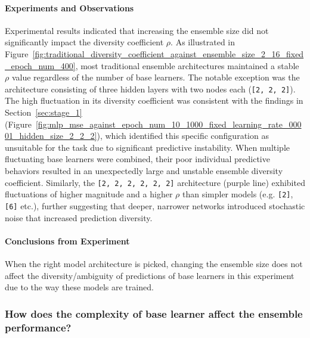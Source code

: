 \documentclass{article}
\begin{document}
\paragraph{Experiments and Observations}
Experimental results indicated that increasing the ensemble size did not significantly impact the diversity coefficient $\rho$. As illustrated in Figure~\ref{fig:traditional_diversity_coefficient_against_ensemble_size_2_16_fixed_epoch_num_400}, most traditional ensemble architectures maintained a stable $\rho$ value regardless of the number of base learners. The notable exception was the architecture consisting of three hidden layers with two nodes each (\texttt{[2, 2, 2]}). The high fluctuation in its diversity coefficient was consistent with the findings in Section~\ref{sec:stage_1} (Figure~\ref{fig:mlp_mse_against_epoch_num_10_1000_fixed_learning_rate_00001_hidden_size_2_2_2}), which identified this specific configuration as unsuitable for the task due to significant predictive instability. When multiple fluctuating base learners were combined, their poor individual predictive behaviors resulted in an unexpectedly large and unstable ensemble diversity coefficient. Similarly, the \texttt{[2, 2, 2, 2, 2, 2]} architecture (purple line) exhibited fluctuations of higher magnitude and a higher $\rho$ than simpler models (e.g. \texttt{[2]}, \texttt{[6]} etc.), further suggesting that deeper, narrower networks introduced stochastic noise that increased prediction diversity. 

\paragraph{Conclusions from Experiment}
When the right model architecture is picked, changing the ensemble size does not affect the diversity/ambiguity of predictions of base learners in this experiment due to the way these models are trained. 


\subsubsection{How does the complexity of base learner affect the ensemble performance? }
\end{document}

